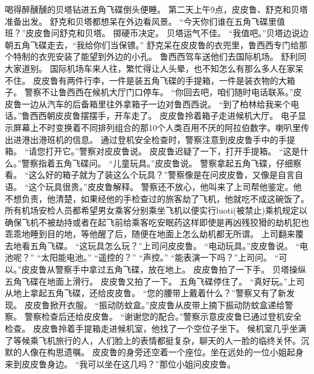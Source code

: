 \documentclass[a4paper,12pt,UTF8,twoside]{ctexbook}
\begin{document}
        喝得醉醺醺的贝塔钻进五角飞碟倒头便睡。 
        第二天上午9点，皮皮鲁、舒克和贝塔准备出发。 
        舒克和贝塔都想呆在外边看风景。 
        “今天你们谁在五角飞碟里值班？”皮皮鲁问舒克和贝塔。 
        掷硬币决定。 
        贝塔运气不佳。 
        “我值吧。”贝塔边说边朝五角飞碟走去，“我给你们当保镖。” 
        舒克呆在皮皮鲁的衣兜里，鲁西西专门给那个特制的衣兜安装了能望到外边的小孔。 
        鲁西西驾车送他们去国际机场。 
        舒利同大家道别。 
        国际机场车来人往，繁忙得让人头晕，也不知怎么有那么多人在家呆不住。 
        皮皮鲁有两件行李，一件是装五角飞碟的手提箱，一件是装衣物的大箱子。 
        警察不让鲁西西在候机大厅门口停车。 
        “你回去吧，咱们随时电话联系。”皮皮鲁一边从汽车的后备箱里往外拿箱子一边对鲁西西说。 
        “到了柏林给我来个电话。”鲁西西朝皮皮鲁摆摆手，开车走了。 
        皮皮鲁拎着箱子走进候机大厅。 
        电子显示屏幕上不时变换着不同排列组合的那10个人类百用不厌的阿拉伯数字。喇叭里传出进港出港班机的信息。 
        通过登机安全检查时，警察注意到皮皮鲁手中的手提箱。 
        “请您打开它。”警察对皮皮鲁说。 
        皮皮鲁迟疑了一下，打开手提箱。 
        “这是什么。”警察指着五角飞碟问。 
        “儿童玩具。”皮皮鲁说。 
        警察拿起五角飞碟，仔细察看。 
        “这么好的箱子就为了装这么个玩具？”警察像是在问皮皮鲁，又像是自言自语。 
        “这个玩具很贵。”皮皮鲁解释。 
        警察还不放心，他叫来了上司帮他鉴定。他不想负责，他清楚，如果经他的手检查过的旅客劫了飞机，他就吃不成这碗饭了。所有机场安检人员都希望男女乘客分别乘坐飞机以便实行luoti(被禁止)乘机规定以确保飞机不被劫持或者在起飞前给乘客吃安眠药这样即使是再凶残狡猾的劫机犯也乖乖地睡到目的地，等他醒了后，随便在地面上怎么劫机都无所谓。 
        上司翻来覆去地看五角飞碟。 
        “这玩具怎么玩？”上司问皮皮鲁。 
        “电动玩具。”皮皮鲁说。 
        “电池呢？” 
        “太阳能电池。” 
        “遥控的？” 
       “声控。” 
        “能表演一下吗？”上司问。 
        “可以。”皮皮鲁从警察手中拿过五角飞碟，放在地上。 
        皮皮鲁拍了一下手。 
        贝塔操纵五角飞碟在地面上滑行。 
        皮皮鲁又拍了一下。 
        五角飞碟停住了。 
        “真好玩。”上司从地上拿起五角飞碟，还给皮皮鲁。 
        “您的腰带上戴着什么？”警察又有了新发现。 
        皮皮鲁掀开衣服。 
        “振动防蚊盒。”皮皮鲁从皮带上摘下振动防蚊盒递给警察。 
        警察检查后还给皮皮鲁。 
        “谢谢您的配合。”警察示意皮皮鲁已通过登机安全检查。 
        皮皮鲁拎着手提箱走进候机室，他找了一个空位子坐下。 
        候机室几乎坐满了等候乘飞机旅行的人，人们脸上的表情都挺复杂，聊天的人一脸的临终关怀。沉默的人像在构思遗嘱。 
        皮皮鲁的身旁还空着一个座位。坐在远处的一位小姐起身来到皮皮鲁身边。 
        “我可以坐在这几吗？”那位小姐问皮皮鲁。 
\end{document}
